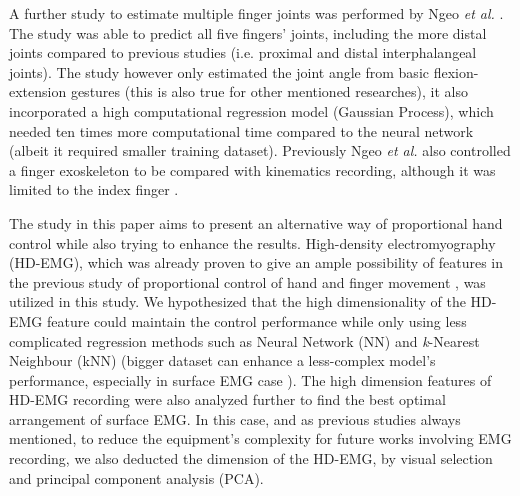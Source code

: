 \documentclass[conference]{IEEEtran}
\begin{document}
A further study to estimate multiple finger joints was performed by Ngeo \textit{et al.} \cite{b16}\cite{b17}. The study was 
able to predict all five fingers’ joints, including the more distal joints compared to previous studies (i.e. 
proximal and distal interphalangeal joints). The study however only estimated the joint angle from basic 
flexion-extension gestures (this is also true for other mentioned researches), it also incorporated a high 
computational regression model (Gaussian Process), which needed ten times more computational time 
compared to the neural network (albeit it required smaller training dataset). Previously Ngeo \textit{et al.} also 
controlled a finger exoskeleton to be compared with kinematics recording, although it was limited to the index 
finger \cite{b18}.


The study in this paper aims to present an alternative way of proportional hand control while also trying 
to enhance the results. High-density electromyography (HD-EMG), which was already proven to give an 
ample possibility of features in the previous study of proportional control of hand \cite{b9} and finger movement 
\cite{b2}\cite{b19}, was utilized in this study. We hypothesized that the high dimensionality of the HD-EMG feature could maintain the control performance while only using less complicated regression methods such as Neural
Network (NN) and \textit{k}-Nearest Neighbour (kNN) (bigger dataset can enhance a less-complex model’s 
performance, especially in surface EMG case \cite{b21}). The high dimension features of HD-EMG recording 
were also analyzed further to find the best optimal arrangement of surface EMG. In this case, and as previous 
studies always mentioned, to reduce the equipment’s complexity for future works involving EMG recording, 
we also deducted the dimension of the HD-EMG, by visual selection and principal component analysis 
(PCA).
\end{document}

